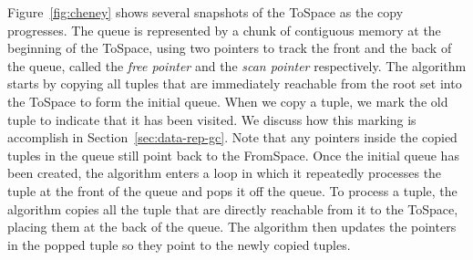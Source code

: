 \documentclass[7x10,nocrop]{TimesAPriori_MIT}%
\begin{document}
Figure~\ref{fig:cheney} shows several snapshots of the ToSpace as the
copy progresses. The queue is represented by a chunk of contiguous
memory at the beginning of the ToSpace, using two pointers to track
the front and the back of the queue, called the \emph{free pointer}
and the \emph{scan pointer} respectively. The algorithm starts by
copying all tuples that are immediately reachable from the root set
into the ToSpace to form the initial queue.  When we copy a tuple, we
mark the old tuple to indicate that it has been visited. We discuss
how this marking is accomplish in Section~\ref{sec:data-rep-gc}. Note
that any pointers inside the copied tuples in the queue still point
back to the FromSpace. Once the initial queue has been created, the
algorithm enters a loop in which it repeatedly processes the tuple at
the front of the queue and pops it off the queue.  To process a tuple,
the algorithm copies all the tuple that are directly reachable from it
to the ToSpace, placing them at the back of the queue. The algorithm
then updates the pointers in the popped tuple so they point to the
newly copied tuples.
\end{document}

